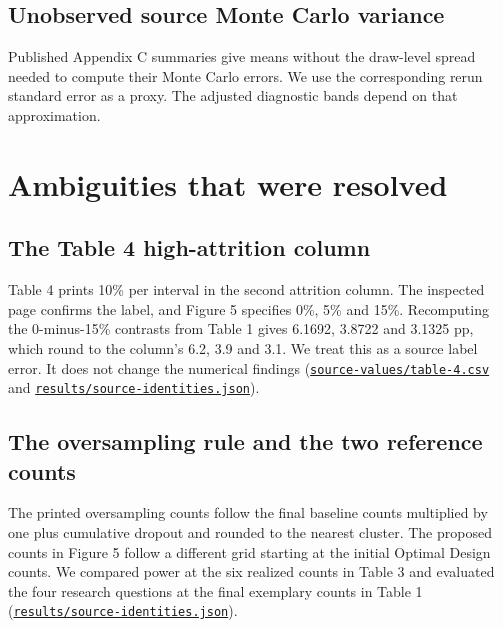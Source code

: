 \subsection{Unobserved source Monte Carlo variance}
Published Appendix C summaries give means without the draw-level spread needed to compute their Monte Carlo errors. We use the corresponding rerun standard error as a proxy. The adjusted diagnostic bands depend on that approximation.

\section{Ambiguities that were resolved}\label{sec:ambiguities}

\subsection{The Table 4 high-attrition column}
Table 4 prints 10\% per interval in the second attrition column. The inspected page confirms the label, and Figure 5 specifies 0\%, 5\% and 15\%. Recomputing the 0-minus-15\% contrasts from Table 1 gives 6.1692, 3.8722 and 3.1325 pp, which round to the column's 6.2, 3.9 and 3.1. We treat this as a source label error. It does not change the numerical findings (\href{https://github.com/alectionary/vibe-math/blob/master/formalization/kupzyk-power-assumptions/source-values/table-4.csv}{\nolinkurl{source-values/table-4.csv}} and \href{https://github.com/alectionary/vibe-math/blob/master/formalization/kupzyk-power-assumptions/results/source-identities.json}{\nolinkurl{results/source-identities.json}}).
\label{dis:table4-high-attrition-label}

\subsection{The oversampling rule and the two reference counts}
The printed oversampling counts follow the final baseline counts multiplied by one plus cumulative dropout and rounded to the nearest cluster. The proposed counts in Figure 5 follow a different grid starting at the initial Optimal Design counts. We compared power at the six realized counts in Table 3 and evaluated the four research questions at the final exemplary counts in Table 1 (\href{https://github.com/alectionary/vibe-math/blob/master/formalization/kupzyk-power-assumptions/results/source-identities.json}{\nolinkurl{results/source-identities.json}}).

